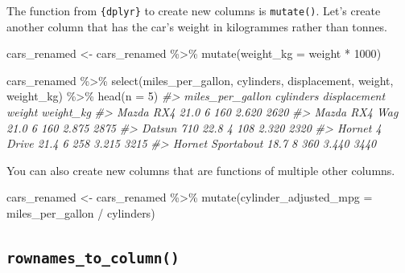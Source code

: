 \documentclass[
  12pt,
]{book}
\newenvironment{Shaded}{\begin{snugshade}}{\end{snugshade}}
\newcommand{\AttributeTok}[1]{\textcolor[rgb]{0.77,0.63,0.00}{#1}}
\newcommand{\CommentTok}[1]{\textcolor[rgb]{0.56,0.35,0.01}{\textit{#1}}}
\newcommand{\DecValTok}[1]{\textcolor[rgb]{0.00,0.00,0.81}{#1}}
\newcommand{\FunctionTok}[1]{\textcolor[rgb]{0.00,0.00,0.00}{#1}}
\newcommand{\NormalTok}[1]{#1}
\newcommand{\OtherTok}[1]{\textcolor[rgb]{0.56,0.35,0.01}{#1}}
\newcommand{\SpecialCharTok}[1]{\textcolor[rgb]{0.00,0.00,0.00}{#1}}
\begin{document}
The function from \texttt{\{dplyr\}} to create new columns is \texttt{mutate()}. Let's create another column that has the car's weight in kilogrammes rather than tonnes.

\begin{Shaded}
\begin{Highlighting}[]
\NormalTok{cars\_renamed }\OtherTok{\textless{}{-}}\NormalTok{ cars\_renamed }\SpecialCharTok{\%\textgreater{}\%} 
  \FunctionTok{mutate}\NormalTok{(}\AttributeTok{weight\_kg =}\NormalTok{ weight }\SpecialCharTok{*} \DecValTok{1000}\NormalTok{)}

\NormalTok{cars\_renamed }\SpecialCharTok{\%\textgreater{}\%} 
  \FunctionTok{select}\NormalTok{(miles\_per\_gallon, cylinders, displacement, weight, weight\_kg) }\SpecialCharTok{\%\textgreater{}\%} 
  \FunctionTok{head}\NormalTok{(}\AttributeTok{n =} \DecValTok{5}\NormalTok{)}
\CommentTok{\#\textgreater{}                   miles\_per\_gallon cylinders displacement weight weight\_kg}
\CommentTok{\#\textgreater{} Mazda RX4                     21.0         6          160  2.620      2620}
\CommentTok{\#\textgreater{} Mazda RX4 Wag                 21.0         6          160  2.875      2875}
\CommentTok{\#\textgreater{} Datsun 710                    22.8         4          108  2.320      2320}
\CommentTok{\#\textgreater{} Hornet 4 Drive                21.4         6          258  3.215      3215}
\CommentTok{\#\textgreater{} Hornet Sportabout             18.7         8          360  3.440      3440}
\end{Highlighting}
\end{Shaded}

You can also create new columns that are functions of multiple other columns.

\begin{Shaded}
\begin{Highlighting}[]
\NormalTok{cars\_renamed }\OtherTok{\textless{}{-}}\NormalTok{ cars\_renamed }\SpecialCharTok{\%\textgreater{}\%} 
  \FunctionTok{mutate}\NormalTok{(}\AttributeTok{cylinder\_adjusted\_mpg =}\NormalTok{ miles\_per\_gallon }\SpecialCharTok{/}\NormalTok{ cylinders)}
\end{Highlighting}
\end{Shaded}

\hypertarget{rownames_to_column}{%
\subsection{\texorpdfstring{\texttt{rownames\_to\_column()}}{rownames\_to\_column()}}\label{rownames_to_column}}
\end{document}
